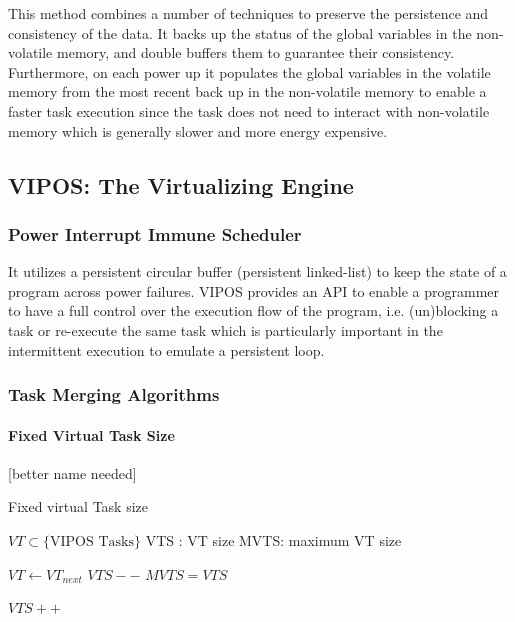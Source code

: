 \documentclass[sigconf,anonymous,review]{acmart}
\begin{document}
	This method combines a number of techniques to preserve the persistence and consistency of the data. It backs up the status of the global variables in the non-volatile memory, and double buffers them to guarantee their consistency. Furthermore, on each power up it populates the global variables in the volatile memory from the most recent back up in the non-volatile memory to enable a faster task execution since the task does not need to interact with non-volatile memory which is generally slower and more energy expensive.   



\subsection{VIPOS: The Virtualizing Engine}
\subsubsection{Power Interrupt Immune Scheduler}
It utilizes a persistent circular buffer (persistent linked-list) to keep the state of a program across power failures. VIPOS provides an API to enable a programmer to have a full control over the execution flow of the program, i.e. (un)blocking a task or re-execute the same task which is particularly important in the intermittent execution to emulate a persistent loop. 

\subsubsection{Task Merging Algorithms}

\paragraph{Fixed Virtual Task Size} [better name needed]

	\begin{algorithm}[t]
		\caption{Fixed virtual Task size}
		\label{algo:fixVirtTask}
		\scriptsize
		\begin{algorithmic}[1]
			\State $VT \subset \text{\{VIPOS Tasks\}} $  
			\State VTS : VT size
			\State MVTS: maximum VT size
			\vspace{0.1cm}

				\State $VT \leftarrow VT_{next}$
				\vspace{0.1cm}
							\State $VTS--$  
							\State $ MVTS = VTS $
						\EndIf
				\EndWhile

				\vspace{0.1cm}
					\State $VTS++$
					\EndIf
				\EndIf
			\EndWhile
		\end{algorithmic}
	\end{algorithm}
\end{document}
